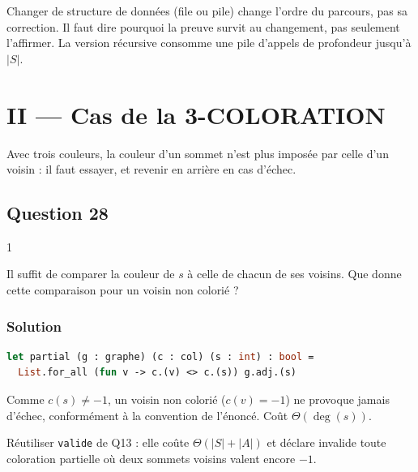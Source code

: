 \documentclass[11pt,a4paper]{article}
\begin{document}
\begin{methode}

Changer de structure de données (file ou pile) change l'ordre du parcours, pas sa correction. Il faut dire pourquoi la preuve survit au changement, pas seulement l'affirmer. La version récursive consomme une pile d'appels de profondeur jusqu'à \(|S|\).

\end{methode}

\hypertarget{ii-cas-de-la-3-coloration}{%
\section{II --- Cas de la 3-COLORATION}\label{ii-cas-de-la-3-coloration}}

Avec trois couleurs, la couleur d'un sommet n'est plus imposée par celle d'un voisin : il faut essayer, et revenir en arrière en cas d'échec.

\hypertarget{question-28}{%
\subsection{Question 28}\label{question-28}}

\begin{indication}{1}

Il suffit de comparer la couleur de \(s\) à celle de chacun de ses voisins. Que donne cette comparaison pour un voisin non colorié ?

\end{indication}

\hypertarget{solution-27}{%
\subsubsection{Solution}\label{solution-27}}

\begin{lstlisting}[language=Caml]
let partial (g : graphe) (c : col) (s : int) : bool =
  List.for_all (fun v -> c.(v) <> c.(s)) g.adj.(s)
\end{lstlisting}

Comme \(c(s) \neq -1\), un voisin non colorié (\(c(v) = -1\)) ne provoque jamais d'échec, conformément à la convention de l'énoncé. Coût \(\Theta(\deg(s))\).

\begin{piege}

Réutiliser \texttt{valide} de Q13 : elle coûte \(\Theta(|S| + |A|)\) et déclare invalide toute coloration partielle où deux sommets voisins valent encore \(-1\).

\end{piege}
\end{document}
